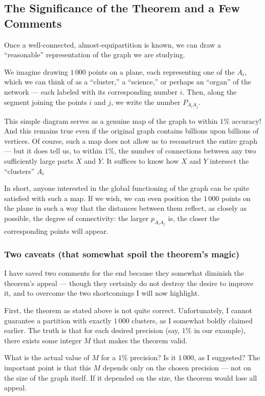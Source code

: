 \documentclass{amsart}
\begin{document}
\subsection{The Significance of the Theorem and a Few Comments}

Once a well-connected, almost-equipartition is known, we can draw a
``reasonable'' representation of the graph we are studying.

We imagine drawing $1\,000$ points on a plane, each representing one
of the $A_{i}$, which we can think of as a ``cluster,'' a ``science,''
or perhaps an ``organ'' of the network --- each labeled with its
corresponding number $i$.  Then, along the segment joining the points
$i$ and $j$, we write the number $P_{A_{i}A_{j}}$.

This simple diagram serves as a genuine map of the graph to within $1\%$
accuracy! And this remains true even if the original graph contains
billions upon billions of vertices. Of course, such a map does not
allow us to reconstruct the entire graph --- but it does tell us, to
within $1\%$, the number of connections between any two sufficiently
large parts $X$ and $Y$. It suffices to know how $X$ and $Y$ intersect the
``clusters'' $A_{i}$

In short, anyone interested in the global functioning of the graph can
be quite satisfied with such a map. If we wish, we can even position
the $1\,000$ points on the plane in such a way that the distances between
them reflect, as closely as possible, the degree of connectivity: the
larger $p_{A_{i}A_{j}}$ is, the closer the corresponding points will
appear.

\subsubsection{Two caveats (that somewhat spoil the theorem’s magic)}

I have saved two comments for the end because they somewhat diminish
the theorem’s appeal --- though they certainly do not destroy the desire
to improve it, and to overcome the two shortcomings I will now
highlight.

First, the theorem as stated above is not quite
correct. Unfortunately, I cannot guarantee a partition with exactly
$1\,000$ clusters, as I somewhat boldly claimed earlier. The truth is
that for each desired precision (say, $1\%$ in our example), there
exists some integer $M$ that makes the theorem valid.

What is the actual value of $M$ for a $1\%$ precision? Is it $1\,000$, as
I suggested? The important point is that this $M$ depends only on the chosen
precision --- not on the size of the graph itself. If it depended on the
size, the theorem would lose all appeal.
\end{document}
